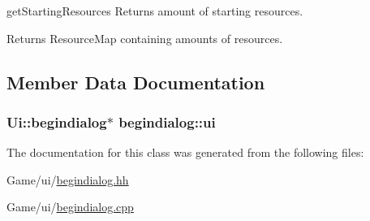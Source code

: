 get\-Starting\-Resources Returns amount of starting resources. 

\begin{DoxyReturn}{Returns}
Resource\-Map containing amounts of resources. 
\end{DoxyReturn}


\subsection{Member Data Documentation}
\hypertarget{classbegindialog_a055ab69448a9247db34df24a4c0abddc}{
\subsubsection[{ui}]{\setlength{\rightskip}{0pt plus 5cm}Ui\-::begindialog$\ast$ begindialog\-::ui\hspace{0.3cm}{\ttfamily [private]}}}\label{classbegindialog_a055ab69448a9247db34df24a4c0abddc}


The documentation for this class was generated from the following files\-:\begin{DoxyCompactItemize}
\item 
Game/ui/\hyperlink{begindialog_8hh}{begindialog.\-hh}\item 
Game/ui/\hyperlink{begindialog_8cpp}{begindialog.\-cpp}\end{DoxyCompactItemize}
